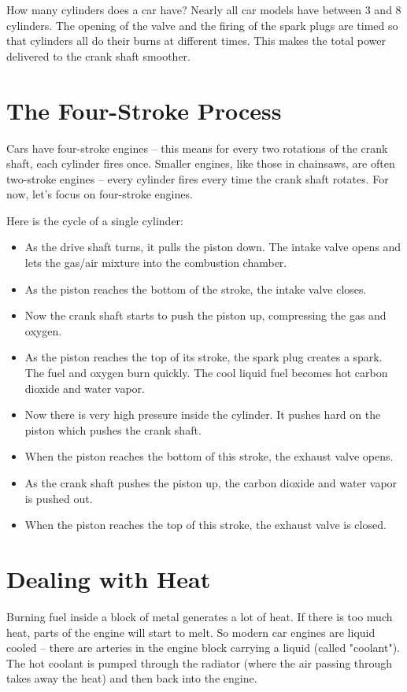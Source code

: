 How many cylinders does a car have?  Nearly all car models have between 3 and 8 cylinders.    The opening of the valve and the firing of the spark plugs are timed so that cylinders all do their burns 
at different times.   This makes the total power delivered to the crank shaft smoother.

\section{The Four-Stroke Process}

Cars have four-stroke engines -- this means for every two rotations of the crank shaft,  each cylinder fires once.  Smaller engines, like those in chainsaws,  are often two-stroke engines -- every cylinder fires every time the crank shaft rotates.  For now,  let's focus on four-stroke engines.

Here is the cycle of a single cylinder:
\begin{itemize}
\item As the drive shaft turns,  it pulls the piston down.  The intake valve opens and lets the gas/air mixture into the combustion chamber.
\item As the piston reaches the bottom of the stroke,  the intake valve closes.
\item Now the crank shaft starts to push the piston up, compressing the gas and oxygen.
\item As the piston reaches the top of its stroke,  the spark plug creates a spark.  The fuel and oxygen burn quickly.  The cool liquid fuel becomes hot carbon dioxide and water vapor.
\item Now there is very high pressure inside the cylinder.  It pushes hard on the piston which pushes  the crank shaft.
\item When the piston reaches the bottom of this stroke,  the exhaust valve opens.
\item As the crank shaft pushes the piston up,  the carbon dioxide and water vapor is pushed out.
\item When the piston reaches the top of this stroke,  the exhaust valve is closed.
\end{itemize}

\section{Dealing with Heat}

Burning fuel inside a block of metal generates a lot of heat.  If there is too much heat,  parts of the engine will start to melt.  So modern car engines are liquid cooled -- there are arteries in the engine block carrying a liquid (called "coolant").  The hot coolant is pumped through the radiator (where the air passing through takes away the heat) and then back into the engine.

